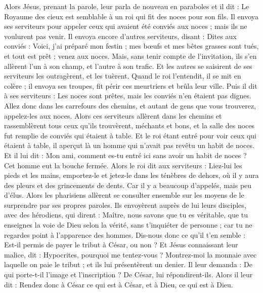 \begin{multicols}{2}
\VerseOne{}Alors Jésus, prenant la parole, leur parla de nouveau en paraboles et il dit :
Le Royaume des cieux est semblable à un roi qui fit des noces pour son fils.
Il envoya ses serviteurs pour appeler ceux qui avaient été conviés aux noces ; mais ils ne voulurent pas venir.
Il envoya encore d'autres serviteurs, disant : Dites aux conviés : Voici, j'ai préparé mon festin ; mes bœufs et mes bêtes grasses sont tués, et tout est prêt ; venez aux noces.
Mais, sans tenir compte de l'invitation, ils s'en allèrent l'un à son champ, et l'autre à son trafic.
Et les autres se saisirent de ses serviteurs les outragèrent, et les tuèrent.
Quand le roi l'entendit, il se mit en colère ; il envoya ses troupes, fit périr ces meurtriers et brûla leur ville.
Puis il dit à ses serviteurs : Les noces sont prêtes, mais les conviés n'en étaient pas dignes.
Allez donc dans les carrefours des chemins, et autant de gens que vous trouverez, appelez-les aux noces.
Alors ces serviteurs allèrent dans les chemins et rassemblèrent tous ceux qu'ils trouvèrent, méchants et bons, et la salle des noces fut remplie de conviés qui étaient à table.
Et le roi étant entré pour voir ceux qui étaient à table, il aperçut là un homme qui n'avait pas revêtu un habit de noces.
Et il lui dit : Mon ami, comment es-tu entré ici sans avoir un habit de noces ? Cet homme eut la bouche fermée.
Alors le roi dit aux serviteurs : Liez-lui les pieds et les mains, emportez-le et jetez-le dans les ténèbres de dehors, où il y aura des pleurs et des grincements de dents.
Car il y a beaucoup d'appelés, mais peu d'élus.
Alors les pharisiens allèrent se consulter ensemble sur les moyens de le surprendre par ses propres paroles.
Ils envoyèrent auprès de lui leurs disciples, avec des hérodiens, qui dirent : Maître, nous savons que tu es véritable, que tu enseignes la voie de Dieu selon la vérité, sans t'inquiéter de personne ; car tu ne regardes point à l'apparence des hommes.
Dis-nous donc ce qu'il t'en semble : Est-il permis de payer le tribut à César, ou non ?
Et Jésus connaissant leur malice, dit : Hypocrites, pourquoi me tentez-vous ?
Montrez-moi la monnaie avec laquelle on paie le tribut ; et ils lui présentèrent un denier.
Il leur demanda : De qui porte-t-il l'image et l'inscription ?
De César, lui répondirent-ils. Alors il leur dit : Rendez donc à César ce qui est à César, et à Dieu, ce qui est à Dieu.

\end{multicols}
